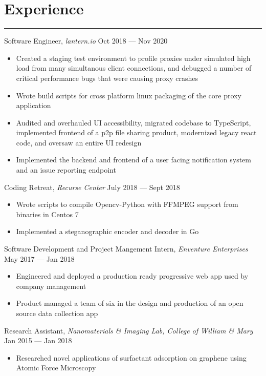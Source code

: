 \documentclass[12pt]{article}
\begin{document}
\section*{Experience}
\vspace{-0.25cm}
\hrule
\vspace{0.25cm}

\noindent Software Engineer, \textit{lantern.io} \hfill Oct 2018 --- Nov 2020
\vspace{-0.1cm}
\begin{itemize}
  \itemsep-0.4em
\item Created a staging test environment to profile proxies under simulated high load from many simultanous client connections, and debugged a number of critical performance bugs that were causing proxy crashes
\item Wrote build scripts for cross platform linux packaging of the core proxy application
\item Audited and overhauled UI accessibility, migrated codebase to TypeScript, implemented frontend of a p2p file sharing product, modernized legacy react code, and oversaw an entire UI redesign
\item Implemented the backend and frontend of a user facing notification system and an issue reporting endpoint
\end{itemize}


\noindent Coding Retreat, \textit{Recurse Center} \hfill July 2018 --- Sept 2018
\vspace{-0.1cm}
\begin{itemize}
  \itemsep-0.4em
	\item Wrote scripts to compile Opencv-Python with FFMPEG support from binaries in Centos 7
        \item Implemented a steganographic encoder and decoder in Go
\end{itemize}

\noindent Software Development and Project Mangement Intern, \textit{Enventure Enterprises} \hfill May 2017 --- Jan 2018
\vspace{-0.1cm}
\begin{itemize}
  \itemsep-0.4em
	\item Engineered and deployed a production ready progressive web app used by company management
	\item Product managed a team of six in the design and production of an open source data collection app
\end{itemize}

\noindent Research Assistant, \textit{Nanomaterials \& Imaging Lab, College of William \& Mary} \hfill Jan 2015 --- Jan 2018
\vspace{-0.1cm}
\begin{itemize}
  \itemsep-0.4em
	\item Researched novel applications of surfactant adsorption on graphene using Atomic Force Microscopy
\end{itemize}
\end{document}

